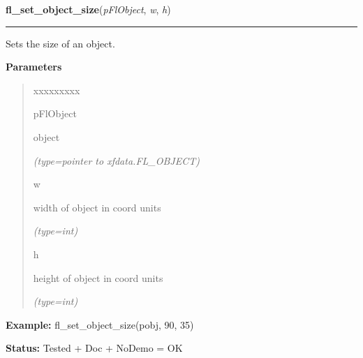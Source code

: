 \hspace{.8\funcindent}\begin{boxedminipage}{\funcwidth}

    \raggedright \textbf{fl\_set\_object\_size}(\textit{pFlObject}, \textit{w}, \textit{h})

    \vspace{-1.5ex}

    \rule{\textwidth}{0.5\fboxrule}
\setlength{\parskip}{2ex}
    Sets the size of an object.

\setlength{\parskip}{1ex}
      \textbf{Parameters}
      \vspace{-1ex}

      \begin{quote}
        \begin{Ventry}{xxxxxxxxx}

          \item[pFlObject]

          object

            {\it (type=pointer to xfdata.FL\_OBJECT)}

          \item[w]

          width of object in coord units

            {\it (type=int)}

          \item[h]

          height of object in coord units

            {\it (type=int)}

        \end{Ventry}

      \end{quote}

\textbf{Example:} fl\_set\_object\_size(pobj, 90, 35)



\textbf{Status:} Tested + Doc + NoDemo = OK



    \end{boxedminipage}

    \label{xformslib:flbasic:fl_set_object_automatic}

    \vspace{0.5ex}

